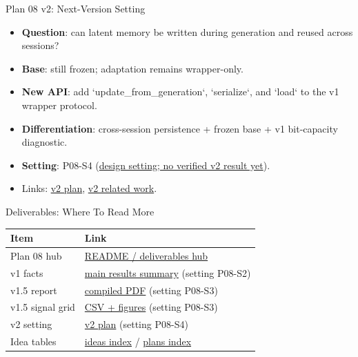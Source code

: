 \begin{frame}{Plan 08 v2: Next-Version Setting}
  \begin{itemize}
    \item \textbf{Question}: can latent memory be written during generation and
      reused across sessions?
    \item \textbf{Base}: still frozen; adaptation remains wrapper-only.
    \item \textbf{New API}: add `update\_from\_generation`, `serialize`, and
      `load` to the v1 wrapper protocol.
    \item \textbf{Differentiation}: cross-session persistence + frozen base +
      v1 bit-capacity diagnostic.
    \item \textbf{Setting}: P08-S4
      (\href{https://github.com/BDeMo/research-notes/blob/main/notes/plans/08-model-outputs-delta-w/settings.md\#p08-s4--v2-design-setting}{design setting; no verified v2 result yet}).
    \item Links:
      \href{https://github.com/BDeMo/research-notes/blob/main/notes/plans/08-model-outputs-delta-w/v2-plan.md}{v2 plan},
      \href{https://github.com/BDeMo/research-notes/blob/main/notes/plans/08-model-outputs-delta-w/v2-related-work.md}{v2 related work}.
  \end{itemize}
\end{frame}

\begin{frame}{Deliverables: Where To Read More}
  \small
  \begin{tabular}{p{}p{}}
    \toprule
    Item & Link \\
    \midrule
    Plan 08 hub &
    \href{https://github.com/BDeMo/research-notes/blob/main/notes/plans/08-model-outputs-delta-w/README.md}{README / deliverables hub} \\
    v1 facts &
    \href{https://github.com/BDeMo/research-notes/blob/main/notes/plans/08-model-outputs-delta-w/v1-results-2026-06-03.md}{main results summary} (setting P08-S2) \\
    v1.5 report &
    \href{https://github.com/BDeMo/research-notes/blob/main/notes/plans/08-model-outputs-delta-w/v1.5-intrinsic-gating-study-2026-06-04.pdf}{compiled PDF} (setting P08-S3) \\
    v1.5 signal grid &
    \href{https://github.com/BDeMo/research-notes/tree/main/notes/plans/08-model-outputs-delta-w/grids-2026-06-04}{CSV + figures} (setting P08-S3) \\
    v2 setting &
    \href{https://github.com/BDeMo/research-notes/blob/main/notes/plans/08-model-outputs-delta-w/v2-plan.md}{v2 plan} (setting P08-S4) \\
    Idea tables &
    \href{https://github.com/BDeMo/research-notes/blob/main/notes/ideas/README.md}{ideas index} /
    \href{https://github.com/BDeMo/research-notes/blob/main/notes/plans/README.md}{plans index} \\
    \bottomrule
  \end{tabular}
\end{frame}

